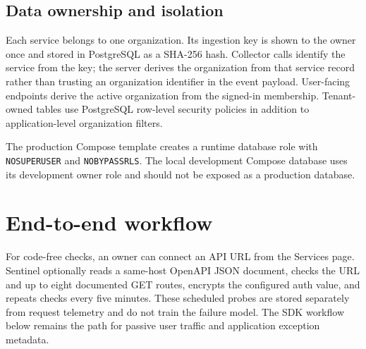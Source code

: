 \documentclass[11pt,a4paper]{article}
\begin{document}
\subsection{Data ownership and isolation}
Each service belongs to one organization. Its ingestion key is shown to the
owner once and stored in PostgreSQL as a SHA-256 hash. Collector calls identify
the service from the key; the server derives the organization from that service
record rather than trusting an organization identifier in the event payload.
User-facing endpoints derive the active organization from the signed-in
membership. Tenant-owned tables use PostgreSQL row-level security policies in
addition to application-level organization filters.

The production Compose template creates a runtime database role with
\texttt{NOSUPERUSER} and \texttt{NOBYPASSRLS}. The local development Compose
database uses its development owner role and should not be exposed as a
production database.

\section{End-to-end workflow}

For code-free checks, an owner can connect an API URL from the Services page.
Sentinel optionally reads a same-host OpenAPI JSON document, checks the URL and
up to eight documented GET routes, encrypts the configured auth value, and
repeats checks every five minutes. These scheduled probes are stored separately
from request telemetry and do not train the failure model. The SDK workflow
below remains the path for passive user traffic and application exception
metadata.
\end{document}
